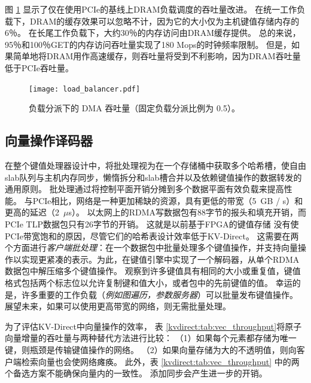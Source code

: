 图 \ref {kvdirect:fig:cache-tput} 显示了仅在使用PCIe的基线上DRAM负载调度的吞吐量改进。
在统一工作负载下，DRAM的缓存效果可以忽略不计，因为它的大小仅为主机键值存储内存的6％。
在长尾工作负载下，大约30％的内存访问由DRAM缓存提供。 总的来说，95％和100％GET的内存访问吞吐量实现了180 Mops的时钟频率限制。
但是，如果简单地将DRAM用作高速缓存，则吞吐量将受到不利影响，因为DRAM吞吐量低于PCIe吞吐量。


\begin{figure}[htbp]
	\centering
	{\texttt{[image: load\_balancer.pdf]}}
	\caption{负载分派下的 DMA 吞吐量（固定负载分派比例为 0.5）。}
	\label{kvdirect:fig:cache-tput}
\end{figure}



\subsection{向量操作译码器}

在整个键值处理器设计中，将批处理视为在一个存储桶中获取多个哈希槽，使自由slab队列与主机内存同步，懒惰拆分和slab槽合并以及依赖键值操作的数据转发的通用原则。
批处理通过将控制平面开销分摊到多个数据平面有效负载来提高性能。
与PCIe相比，网络是一种更加稀缺的资源，具有更低的带宽（5~GB / s）和更高的延迟（2~$\mu$s）。
以太网上的RDMA写数据包有88字节的报头和填充开销，而PCIe TLP数据包只有26字节的开销。
这就是以前基于FPGA的键值存储 \cite{blott13hotcloud,blott2015scaling} 没有使PCIe带宽饱和的原因，尽管它们的哈希表设计效率低于KV-Direct。
这需要在两个方面进行\textit {客户端批处理}：在一个数据包中批量处理多个键值操作，并支持向量操作以实现更紧凑的表示。为此，在键值引擎中实现了一个解码器，从单个RDMA数据包中解压缩多个键值操作。
观察到许多键值具有相同的大小或重复值，键值格式包括两个标志位以允许复制键和值大小，或者包中的先前键值的值。
幸运的是，许多重要的工作负载（\textit {例如图遍历，参数服务器}）可以批量发布键值操作。
展望未来，如果可以使用更高带宽的网络，则无需批量处理。


为了评估KV-Direct中向量操作的效率，
表 \ref {kvdirect:tab:vec_throughput}将原子向量增量的吞吐量与两种替代方法进行比较：
（1）如果每个元素都存储为唯一键，则瓶颈是传输键值操作的网络。
（2）如果向量存储为大的不透明值，则向客户端检索向量也会使网络瘫痪。
此外，表 \ref {kvdirect:tab:vec_throughput} 中的两个备选方案不能确保向量内的一致性。 添加同步会产生进一步的开销。



